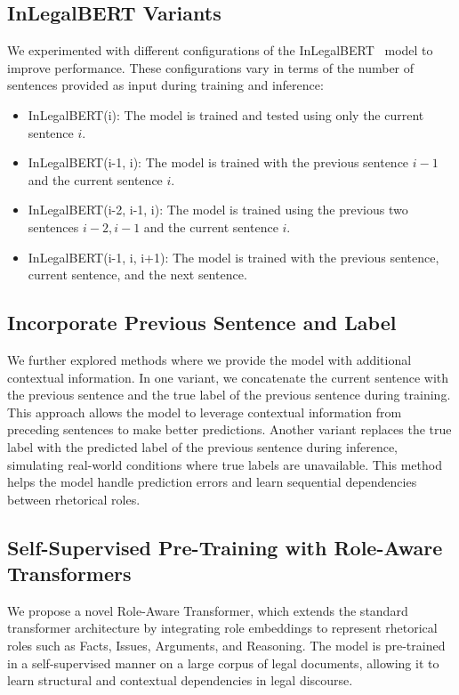 \subsection{InLegalBERT Variants}
We experimented with different configurations of the InLegalBERT~\citet{paul-2022-pretraining} model to improve performance. These configurations vary in terms of the number of sentences provided as input during training and inference:
\begin{itemize}
    \item InLegalBERT(i): The model is trained and tested using only the current sentence \( i \).
    \item InLegalBERT(i-1, i): The model is trained with the previous sentence \( i-1 \) and the current sentence \( i \).
    \item InLegalBERT(i-2, i-1, i): The model is trained using the previous two sentences \( i-2, i-1 \) and the current sentence \( i \).
    \item InLegalBERT(i-1, i, i+1): The model is trained with the previous sentence, current sentence, and the next sentence.
\end{itemize}

\subsection{Incorporate Previous Sentence and Label}
We further explored methods where we provide the model with additional contextual information. In one variant, we concatenate the current sentence with the previous sentence and the true label of the previous sentence during training. This approach allows the model to leverage contextual information from preceding sentences to make better predictions. Another variant replaces the true label with the predicted label of the previous sentence during inference, simulating real-world conditions where true labels are unavailable. This method helps the model handle prediction errors and learn sequential dependencies between rhetorical roles.

\subsection{Self-Supervised Pre-Training with Role-Aware Transformers}

We propose a novel Role-Aware Transformer, which extends the standard transformer architecture by integrating role embeddings to represent rhetorical roles such as Facts, Issues, Arguments, and Reasoning. The model is pre-trained in a self-supervised manner on a large corpus of legal documents, allowing it to learn structural and contextual dependencies in legal discourse.

